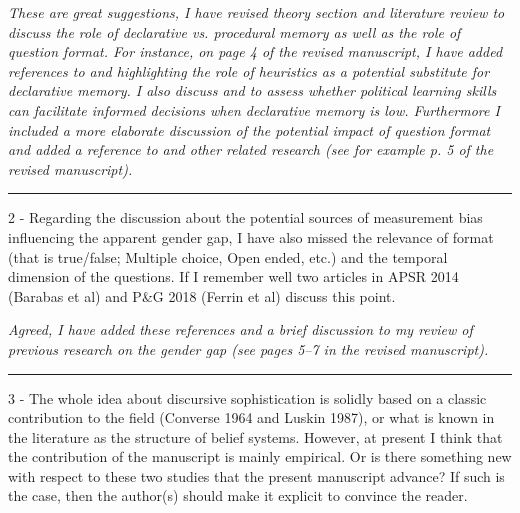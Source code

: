 \textit{These are great suggestions, I have revised theory section and literature review to discuss the role of declarative vs. procedural memory as well as the role of question format. For instance, on page 4 of the revised manuscript, I have added references to \citet{lupia1994shortcuts,lau2001advantages} and \citet{lau2008exploration} highlighting the role of heuristics as a potential substitute for declarative memory. I also discuss \citet{prior2008money} and \citet{bernhard2020more} to assess whether political learning skills can facilitate informed decisions when declarative memory is low. Furthermore I included a more elaborate discussion of the potential impact of question format and added a reference to \citet{fraile2020unpacking} and other related research (see for example p. 5 of the revised manuscript).}


\rule{\linewidth}{.01cm}

2 - Regarding the discussion about the potential sources of measurement bias influencing the apparent gender gap, I have also missed the relevance of format (that is true/false; Multiple choice, Open ended, etc.) and the temporal dimension of the questions. If I remember well two articles in APSR 2014 (Barabas et al) and P\&G 2018 (Ferrin et al) discuss this point.

\textit{Agreed, I have added these references and a brief discussion to my review of previous research on the gender gap (see pages 5--7 in the revised manuscript).}


\rule{\linewidth}{.01cm}

3 - The whole idea about discursive sophistication is solidly based on a classic contribution to the field (Converse 1964 and Luskin 1987), or what is known in the literature as the structure of belief systems. However, at present I think that the contribution of the manuscript is mainly empirical. Or is there something new with respect to these two studies that the present manuscript advance? If such is the case, then the author(s) should make it explicit to convince the reader.

